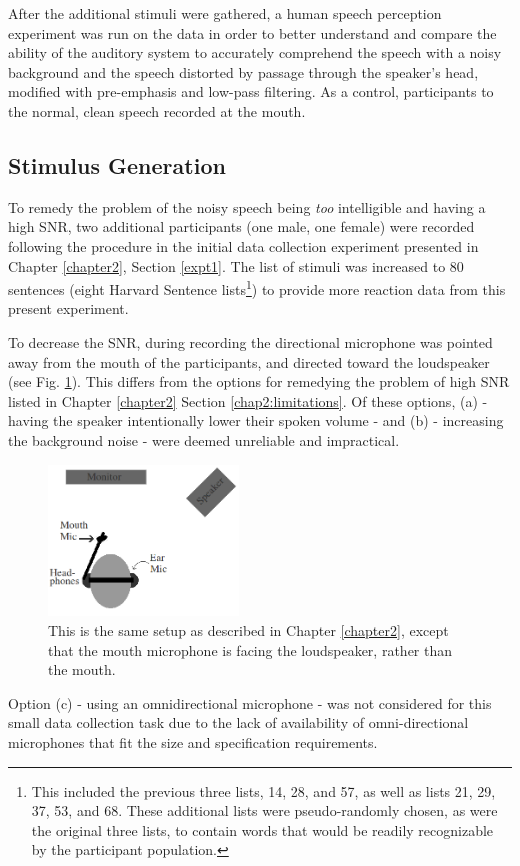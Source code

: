 After the additional stimuli were gathered, a human speech perception experiment was run on the data in order to better understand and compare the ability of the auditory system to accurately comprehend the speech with a noisy background and the speech distorted by passage through the speaker's head, modified with pre-emphasis and low-pass filtering.  As a control, participants \DIFdelbegin {}\DIFdelend \DIFaddbegin {}\DIFaddend to the normal, clean speech recorded at the mouth.

\subsection{Stimulus Generation}
\label{chap3:methods:stimuli}

To remedy the problem of the noisy speech being \textit{too} intelligible and having a high SNR, 
two additional participants (one male, one female) were recorded following the procedure in the initial data collection experiment presented in Chapter \ref{chapter2}, Section \ref{expt1}.  The list of stimuli was increased to 80 sentences (eight Harvard Sentence lists\footnote{This included the previous three lists, 14, 28, and 57, as well as lists 21, 29, 37, 53, and 68. These additional lists were pseudo-randomly chosen, as were the original three lists, to contain words that would be readily recognizable by the participant population.}) to provide more reaction data from this present experiment.  

To decrease the SNR, during recording the directional microphone was pointed away from the mouth of the participants, and directed toward the loudspeaker (see Fig. \ref{fig:overallSetUp_new}).  This differs from the options for remedying the problem of high SNR listed in Chapter \ref{chapter2} Section \ref{chap2:limitations}.  Of these options, (a) - having the speaker intentionally lower their spoken volume - and (b) - increasing the background noise - were deemed unreliable and impractical.  
%
\begin{figure}
\centering
  \includegraphics[width=0.45\textwidth]{figure/overallSetUp_new.png}
  \caption{This is the same setup as described in Chapter \ref{chapter2}, except that the mouth microphone is facing the loudspeaker, rather than the mouth.}
  \label{fig:overallSetUp_new}
\end{figure}
%
Option (c) - using an omnidirectional microphone - was not considered for this small data collection task due to the lack of availability of omni-directional microphones that fit the size and specification requirements.

